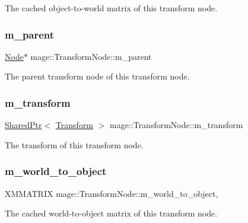 The cached object-\/to-\/world matrix of this transform node. \hypertarget{structmage_1_1_transform_node_afad4b8198a5e4b1a3c46fb8e51fd17c2}{}\label{structmage_1_1_transform_node_afad4b8198a5e4b1a3c46fb8e51fd17c2} 
\subsubsection{\texorpdfstring{m\+\_\+parent}{m\_parent}}
{\footnotesize\ttfamily \hyperlink{classmage_1_1_node}{Node}$\ast$ mage\+::\+Transform\+Node\+::m\+\_\+parent\hspace{0.3cm}{\ttfamily [private]}}

The parent transform node of this transform node. \hypertarget{structmage_1_1_transform_node_a648c4757ba4d10e7749217077d11475d}{}\label{structmage_1_1_transform_node_a648c4757ba4d10e7749217077d11475d} 
\subsubsection{\texorpdfstring{m\+\_\+transform}{m\_transform}}
{\footnotesize\ttfamily \hyperlink{namespacemage_a1e01ae66713838a7a67d30e44c67703e}{Shared\+Ptr}$<$ \hyperlink{structmage_1_1_transform}{Transform} $>$ mage\+::\+Transform\+Node\+::m\+\_\+transform\hspace{0.3cm}{\ttfamily [private]}}

The transform of this transform node. \hypertarget{structmage_1_1_transform_node_ade413fc9a980ce8e1191c17f94f25e3f}{}\label{structmage_1_1_transform_node_ade413fc9a980ce8e1191c17f94f25e3f} 
\subsubsection{\texorpdfstring{m\+\_\+world\+\_\+to\+\_\+object}{m\_world\_to\_object}}
{\footnotesize\ttfamily X\+M\+M\+A\+T\+R\+IX mage\+::\+Transform\+Node\+::m\+\_\+world\+\_\+to\+\_\+object\hspace{0.3cm}{\ttfamily [mutable]}, {\ttfamily [private]}}

The cached world-\/to-\/object matrix of this transform node. 